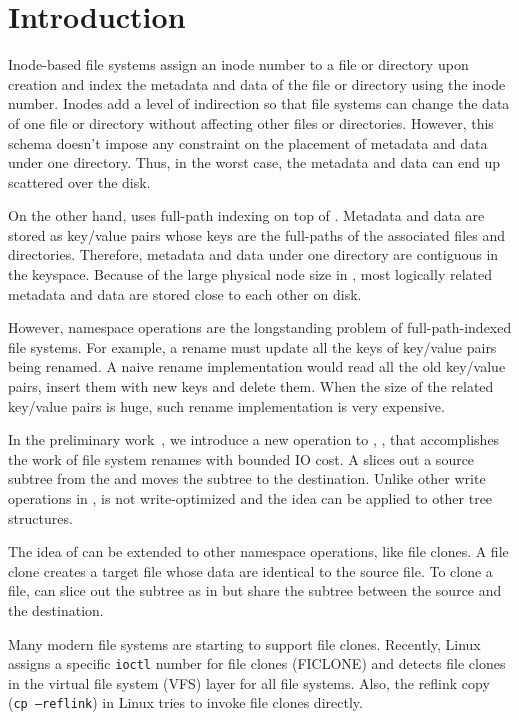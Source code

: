 \section{Introduction}
\label{sec:intro}

Inode-based file systems assign an inode number to a file or directory upon
creation and index the metadata and data of the file or directory using the
inode number.
Inodes add a level of indirection so that file systems can change the data of
one file or directory without affecting other files or directories.
However, this schema doesn't impose any constraint on the placement of metadata
and data under one directory.
Thus, in the worst case, the metadata and data can end up scattered over the
disk.

On the other hand, \betrfs uses full-path indexing on top of \bets.
Metadata and data are stored as key/value pairs whose keys are the full-paths of
the associated files and directories.
Therefore, metadata and data under one directory are contiguous in the keyspace.
Because of the large physical node size in \bets, most logically related
metadata and data are stored close to each other on disk.

However, namespace operations are the longstanding problem of full-path-indexed
file systems.
For example, a rename must update all the keys of key/value pairs being renamed.
A naive rename implementation would read all the old key/value pairs, insert
them with new keys and delete them.
When the size of the related key/value pairs is huge, such rename implementation
is very expensive.

In the preliminary work~\cite{betrfs4}, we introduce a new operation to \bets,
\rr, that accomplishes the work of file system renames with bounded IO cost.
A \rr slices out a source subtree from the \bet and moves the subtree to the
destination.
Unlike other write operations in \bets, \rr is not write-optimized and the
idea can be applied to other tree structures.

The idea of \rr can be extended to other namespace operations, like file clones.
A file clone creates a target file whose data are identical to the source file.
To clone a file, \betrfs can slice out the subtree as in \rr but share
the subtree between the source and the destination.

Many modern file systems are starting to support file clones.
Recently, Linux assigns a specific \texttt{ioctl} number for file clones
(FICLONE) and detects file clones in the virtual file system (VFS) layer for all
file systems.
Also, the reflink copy (\texttt{cp --reflink}) in Linux tries to invoke file
clones directly.

